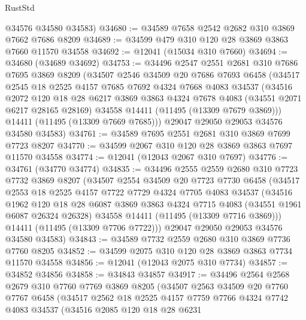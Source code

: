 \begin{lexlean}{RustStd}
\begin{coremodule}
      @34576
      @34580
      @34583)
@34680 := @34589 @7658 @2542 @2682 @310 @3869 @7662 @7686 @8209
@34689 := @34599 @479 @310 @120 @28 @3869 @3863 @7660 @11570 @34558
@34692 := @12041 (@15034 @310 @7660)
@34694 := @34680 (@34689 @34692)
@34753 := @34496
    @2547
    @2551
    @2681
    @310
    @7686
    @7695
    @3869
    @8209
    (@34507
      @2546
      @34509
      @20
      @7686
      @7693
      @6458
      (@34517
        @2545
        @18
        @2525
        @4157
        @7685
        @7692
        @4324
        @7668
        @4083
        @34537
        (@34516
          @2072
          @120
          @18
          @28
          @6217
          @3869
          @3863
          @4324
          @7678
          @4083
          (@34551 @2071 @6217 @28165 @28169)
          @34558
          @14411
          (@11495 (@13309 @7679 @3869)))
        @14411
        (@11495 (@13309 @7669 @7685)))
      @29047
      @29050
      @29053
      @34576
      @34580
      @34583)
@34761 := @34589 @7695 @2551 @2681 @310 @3869 @7699 @7723 @8207
@34770 := @34599 @2067 @310 @120 @28 @3869 @3863 @7697 @11570 @34558
@34774 := @12041 (@12043 @2067 @310 @7697)
@34776 := @34761 (@34770 @34774)
@34835 := @34496
    @2555
    @2559
    @2680
    @310
    @7723
    @7732
    @3869
    @8207
    (@34507
      @2554
      @34509
      @20
      @7723
      @7730
      @6458
      (@34517
        @2553
        @18
        @2525
        @4157
        @7722
        @7729
        @4324
        @7705
        @4083
        @34537
        (@34516
          @1962
          @120
          @18
          @28
          @6087
          @3869
          @3863
          @4324
          @7715
          @4083
          (@34551 @1961 @6087 @26324 @26328)
          @34558
          @14411
          (@11495 (@13309 @7716 @3869)))
        @14411
        (@11495 (@13309 @7706 @7722)))
      @29047
      @29050
      @29053
      @34576
      @34580
      @34583)
@34843 := @34589 @7732 @2559 @2680 @310 @3869 @7736 @7760 @8205
@34852 := @34599 @2075 @310 @120 @28 @3869 @3863 @7734 @11570 @34558
@34856 := @12041 (@12043 @2075 @310 @7734)
@34857 := @34852 @34856
@34858 := @34843 @34857
@34917 := @34496
    @2564
    @2568
    @2679
    @310
    @7760
    @7769
    @3869
    @8205
    (@34507
      @2563
      @34509
      @20
      @7760
      @7767
      @6458
      (@34517
        @2562
        @18
        @2525
        @4157
        @7759
        @7766
        @4324
        @7742
        @4083
        @34537
        (@34516
          @2085
          @120
          @18
          @28
          @6231

\end{coremodule}
\end{lexlean}

